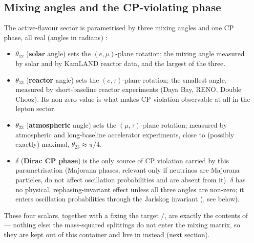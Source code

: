 \begin{theorybox}
\subsection*{Mixing angles and the CP-violating phase}
The active-flavour sector is parametrised by three mixing angles and one CP
phase, all real (angles in radians) \parencite{ParticleDataGroup}:
\begin{itemize}
  \item $\theta_{12}$ (\textbf{solar} angle) sets the $(e,\mu)$-plane
    rotation; the mixing angle measured by solar and by KamLAND reactor
    data, and the largest of the three.
  \item $\theta_{13}$ (\textbf{reactor} angle) sets the $(e,\tau)$-plane
    rotation; the smallest angle, measured by short-baseline reactor
    experiments (Daya Bay, RENO, Double Chooz). Its non-zero value is what
    makes CP violation observable at all in the lepton sector.
  \item $\theta_{23}$ (\textbf{atmospheric} angle) sets the $(\mu,\tau)$-plane
    rotation; measured by atmospheric and long-baseline accelerator
    experiments, close to (possibly exactly) maximal, $\theta_{23}\approx\pi/4$.
  \item $\delta$ (\textbf{Dirac CP phase}) is the only source of CP
    violation carried by this parametrisation (Majorana phases, relevant
    only if neutrinos are Majorana particles, do not affect oscillation
    probabilities and are absent from it). $\delta$ has no physical,
    rephasing-invariant effect unless all three angles are non-zero; it
    enters oscillation probabilities through the Jarlskog invariant
    (, see below).
\end{itemize}
These four scalars, together with a  fixing the
target /, are exactly the contents of
 --- nothing else: the mass-squared splittings do not
enter the mixing matrix, so they are kept out of this container and live in
 instead (next section).


\end{theorybox}
